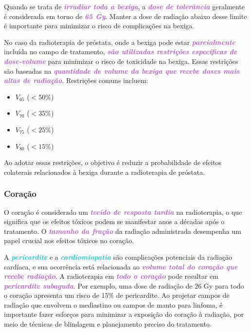 \documentclass[11pt,a4paper]{article}
\newcounter{exemplo}
\begin{document}
	Quando se trata de \textcolor{MediumOrchid}{\textbf{\textit{irradiar toda a bexiga}}}, a \textcolor{MediumOrchid}{\textbf{\textit{dose de tolerância}}} geralmente é considerada em torno de \textcolor{MediumOrchid}{\textbf{\textit{65 Gy}}}. Manter a dose de radiação abaixo desse limite é importante para minimizar o risco de complicações na bexiga.

	No caso da radioterapia de próstata, onde a bexiga pode estar \textcolor{MediumOrchid}{\textbf{\textit{parcialmente}}} incluída no campo de tratamento, \textcolor{MediumOrchid}{\textbf{\textit{são utilizadas restrições específicas de dose-volume}}} para minimizar o risco de toxicidade na bexiga. Essas restrições são baseadas na \textcolor{MediumOrchid}{\textbf{\textit{quantidade de volume da bexiga que recebe doses mais altas de radiação}}}. Restrições comuns incluem:

	\begin{itemize}
		\item $V_{65}$ ($< 50\%$)
		\item $V_{70}$ ($< 35\%$)
		\item $V_{75}$ ($< 25\%$)
		\item $V_{80}$ ($< 15\%$)
	\end{itemize}

	Ao adotar essas restrições, o objetivo é reduzir a probabilidade de efeitos colaterais relacionados à bexiga durante a radioterapia de próstata.

\subsubsection*{Coração}

	O coração é considerado um \textcolor{MediumOrchid}{\textbf{\textit{tecido de resposta tardia}}} na radioterapia, o que significa que os efeitos tóxicos podem se manifestar anos a décadas após o tratamento. O \textcolor{MediumOrchid}{\textbf{\textit{tamanho da fração}}} da radiação administrada desempenha um papel crucial nos efeitos tóxicos no coração.

	A \textcolor{DarkTurquoise}{\textbf{\textit{pericardite}}} e a \textcolor{DarkTurquoise}{\textbf{\textit{cardiomiopatia}}} são complicações potenciais da radiação cardíaca, e sua ocorrência está relacionada ao \textcolor{MediumOrchid}{\textbf{\textit{volume total do coração que recebe radiação}}}. A radioterapia em \textcolor{MediumOrchid}{\textbf{\textit{todo o coração}}} pode resultar em \textcolor{MediumOrchid}{\textbf{\textit{pericardite subaguda}}}. Por exemplo, uma dose de radiação de 26 Gy para todo o coração apresenta um risco de 15\% de pericardite. Ao projetar campos de radiação que envolvem o mediastino ou campos de manto para linfoma, é importante fazer esforços para minimizar a exposição do coração à radiação, por meio de técnicas de blindagem e planejamento preciso do tratamento.
\end{document}
